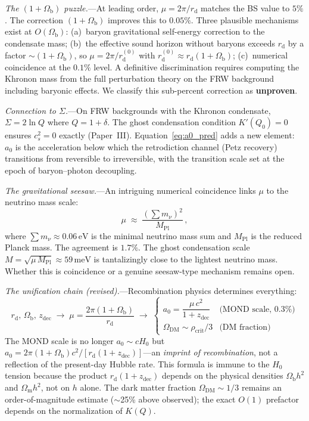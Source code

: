 \documentclass[prd,twocolumn,superscriptaddress,longbibliography,floatfix]{revtex4-2}
\newcommand{\OmDM}{\Omega_{\mathrm{DM}}}
\begin{document}
\emph{The $(1+\Omega_{\mathrm{b}})$ puzzle.}---At
leading order, $\mu = 2\pi/r_{\mathrm{d}}$ matches
the BS value to $5\%$.  The correction
$(1+\Omega_{\mathrm{b}})$ improves this to $0.05\%$.
Three plausible mechanisms exist at
$O(\Omega_{\mathrm{b}})$:
(a)~baryon gravitational self-energy correction to
the condensate mass;
(b)~the effective sound horizon without baryons
exceeds $r_{\mathrm{d}}$ by a factor
${\sim}(1+\Omega_{\mathrm{b}})$, so
$\mu = 2\pi/r_{\mathrm{d}}^{(0)}$ with
$r_{\mathrm{d}}^{(0)} \approx
r_{\mathrm{d}}(1+\Omega_{\mathrm{b}})$;
(c)~numerical coincidence at the $0.1\%$ level.
A definitive discrimination requires computing
the Khronon mass from the full perturbation theory
on the FRW background including baryonic effects.
We classify this sub-percent correction as
\textbf{unproven}.

\emph{Connection to $\Sigma$.}---On FRW backgrounds
with the Khronon condensate,
$\Sigma = 2\ln Q$ where $Q = 1 + \delta$.
The ghost condensation condition $K'(Q_0) = 0$ ensures
$c_s^2 = 0$ exactly (Paper~III).
Equation~\eqref{eq:a0_pred} adds a new element:
$a_0$ is the acceleration below which the
retrodiction channel (Petz recovery) transitions from
reversible to irreversible, with the transition scale
set at the epoch of baryon--photon decoupling.

\emph{The gravitational seesaw.}---An intriguing
numerical coincidence links $\mu$ to the neutrino
mass scale:
\begin{equation}
\mu \;\approx\; \frac{(\sum m_\nu)^2}{M_{\mathrm{Pl}}}\,,
\label{eq:seesaw}
\end{equation}
where $\sum m_\nu \approx 0.06\,\mathrm{eV}$ is
the minimal neutrino mass sum and
$M_{\mathrm{Pl}}$ is the reduced Planck mass.
The agreement is $1.7\%$.
The ghost condensation scale
$M = \sqrt{\mu\, M_{\mathrm{Pl}}} \approx 59\,
\mathrm{meV}$
is tantalizingly close to the lightest neutrino mass.
Whether this is coincidence or a genuine seesaw-type
mechanism remains open.

\emph{The unification chain (revised).}---Recombination
physics determines everything:
\begin{equation}
r_{\mathrm{d}},\,\Omega_{\mathrm{b}},\,z_{\mathrm{dec}}
\;\longrightarrow\; \mu = \frac{2\pi(1+\Omega_{\mathrm{b}})}{r_{\mathrm{d}}}
\;\longrightarrow\;
\begin{cases}
a_0 = \dfrac{\mu\,c^2}{1+z_{\mathrm{dec}}}
  & \text{(MOND scale, 0.3\%)}\\[4pt]
\OmDM \sim \rho_{\mathrm{crit}}/3
  & \text{(DM fraction)}
\end{cases}
\label{eq:unification_chain}
\end{equation}
The MOND scale is no longer $a_0 \sim cH_0$ but
$a_0 = 2\pi(1+\Omega_{\mathrm{b}})c^2/
[r_{\mathrm{d}}(1+z_{\mathrm{dec}})]$---an
\emph{imprint of recombination}, not a reflection of
the present-day Hubble rate.
This formula is immune to the $H_0$ tension because
the product $r_{\mathrm{d}}(1+z_{\mathrm{dec}})$
depends on the physical densities
$\Omega_{\mathrm{b}} h^2$ and
$\Omega_{\mathrm{m}} h^2$, not on $h$ alone.
The dark matter fraction $\OmDM \sim 1/3$ remains
an order-of-magnitude estimate ($\sim$25\% above
observed); the exact $O(1)$ prefactor depends on
the normalization of $K(Q)$.
\end{document}
